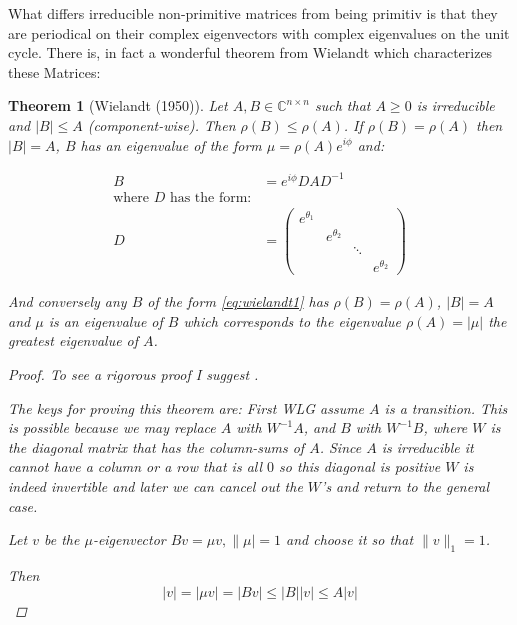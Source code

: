\documentclass[a4paper,10pt]{article}
\newcommand{\C}{\mathbb{C}}
\theoremstyle{definition}
\theoremstyle{remark}
\theoremstyle{plain}
\newtheorem{thm}{Theorem}[section]
\begin{document}
What differs irreducible non-primitive matrices from being primitiv is
that they are periodical on their complex eigenvectors with complex eigenvalues
on the unit cycle. There is, in fact a wonderful theorem from Wielandt which
characterizes these Matrices:

\begin{thm}[Wielandt (1950)]
\label{thm:wielandt}
Let $A,B \in \C^{n \times n}$ such that $A \geq 0$ is irreducible and $|B| \leq
A$ (component-wise). Then $\rho(B) \leq \rho(A)$.
If $\rho(B)=\rho(A)$ then $|B|=A$, $B$ has an eigenvalue of the form $\mu =
\rho(A)e^{i \phi}$ and:

\begin{equation}
\begin{aligned}
\label{eq:wielandt1}
B &= 
e^{i \phi}DAD^{-1} \\ 
\text{where } D \text{ has the form:}\\
D &= 
\begin{pmatrix}
e^{\theta_1} & & & \\
& e^{\theta_2} & & \\
& & \ddots & \\
& & & e^{\theta_2}
\end{pmatrix}
\end{aligned}
\end{equation}

And conversely any $B$ of the form \ref{eq:wielandt1}
has $\rho(B) = \rho(A)$, $|B|=A$ and $\mu$ is an eigenvalue of $B$ which
corresponds to the eigenvalue $\rho(A)=|\mu|$ the greatest eigenvalue of $A$.

\begin{proof}
To see a rigorous proof I suggest \textcite{meyer2000matrix}.

The keys for proving this theorem are:
First WLG assume $A$ is a transition. This is possible because we may replace $A$ with $W^{-1}A$, and $B$ with
$W^{-1}B$, where $W$ is the diagonal matrix that has the column-sums of $A$.
Since $A$ is irreducible it cannot have a column or a row that is all $0$
so this diagonal is positive $W$ is indeed invertible and later we can cancel out the
$W$'s and return to the general case.

Let $v$ be the $\mu$-eigenvector $Bv = \mu v, \|\mu|=1$ and choose it so that 
$\|v\|_1=1$.

Then 
\begin{equation}
|v| = |\mu v| = |B v| \leq |B| |v|
\leq A |v|
\end{equation}


\end{proof}
\end{thm}
\end{document}
